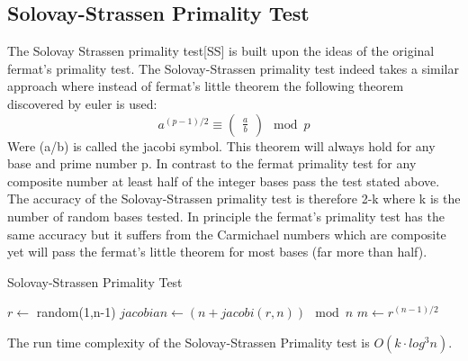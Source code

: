 \documentclass[compressed,final,notitlepage,narroweqnarray,inline,twoside,]{ieee}
\begin{document}
\subsection{Solovay-Strassen Primality Test}
The Solovay Strassen primality test[SS] is built upon the ideas of the original fermat’s primality test. The Solovay-Strassen primality test indeed takes a similar approach where instead of fermat’s little theorem the following theorem discovered by euler is used:
\begin{equation}
a^{(p-1)/2} \equiv \begin{pmatrix}\frac{a}{b}\end{pmatrix} \mod p
\end{equation}
Were (a/b) is called the jacobi symbol. This theorem will always hold for any base and prime number p. In contrast to the fermat primality test for any composite  number at least half of the integer bases pass the test stated above. The accuracy of the Solovay-Strassen primality test is therefore 2-k where k is the number of random bases tested. In principle the fermat’s primality test has the same accuracy but it suffers from the Carmichael numbers which are composite yet will pass the fermat’s little theorem for most bases (far more than half).  
\begin{algorithm}[ht]
 \caption{Solovay-Strassen Primality Test}
 {
 	\;
 }
 {
	$r \longleftarrow$ random(1,n-1) \;
	$jacobian \longleftarrow (n+jacobi(r,n)) \mod n$ \;
	$m \longleftarrow r^{(n-1)/2}$ \;
	{
		\;
	}
 }
 \;
\end{algorithm}
The run time complexity of the Solovay-Strassen Primality test is $O(k \cdot log^3 n)$. 
\end{document}
